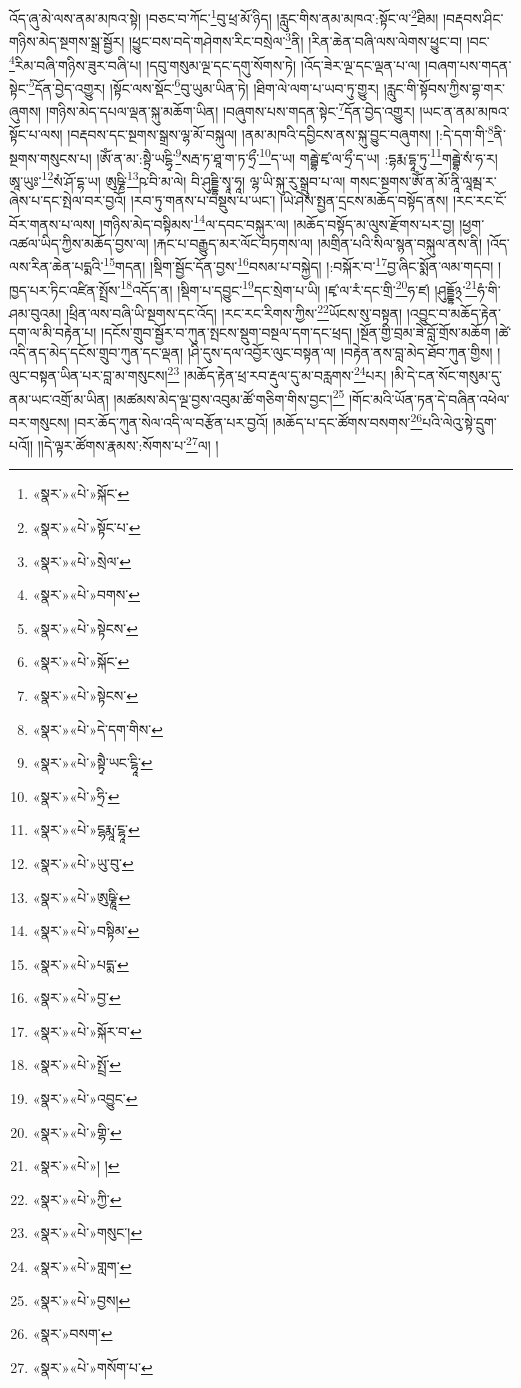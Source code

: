 འོད་ཞུ་མེ་ལས་ནམ་མཁའ་སྟེ། །བཅང་བ་ཀོང་\footnote{«སྣར་»«པེ་»སྐོང་}བུ་ཕྲ་མོ་ཉིད། །རླུང་གིས་ནམ་མཁའ་:སྟོང་ལ་\footnote{«སྣར་»«པེ་»སྟོང་པ་}ཐིམ། །བརྡབས་ཤིང་གཉིས་མེད་སྔགས་སྒྲ་སྦྱོར། །ཕྱུང་བས་བདེ་གཤེགས་རིང་བསྲེལ་\footnote{«སྣར་»«པེ་»སྲེལ་}ནི། །རིན་ཆེན་བཞི་ལས་ལེགས་ཕྱུང་བ། །བང་\footnote{«སྣར་»«པེ་»བགས་}རིམ་བཞི་གཉིས་ཟུར་བཞི་པ། །དབུ་གསུམ་ལྔ་དང་དགུ་སོགས་ཏེ། །འོད་ཟེར་ལྔ་དང་ལྡན་པ་ལ། །བཞག་པས་གདན་སྟེང་\footnote{«སྣར་»«པེ་»སྟེངས་}དོན་བྱེད་འགྱུར། །སྟོང་ལས་སྡོང་\footnote{«སྣར་»«པེ་»སྐོང་}བུ་ཡུམ་ཡིན་ཏེ། །ཐིག་ལེ་ལག་པ་ཡབ་ཏུ་གྱུར། །རླུང་གི་སྟོབས་ཀྱིས་བྷ་གར་ཞུགས། །གཉིས་མེད་དཔལ་ལྡན་སྐུ་མཆོག་ཡིན། །བཞུགས་པས་གདན་སྟེང་\footnote{«སྣར་»«པེ་»སྟེངས་}དོན་བྱེད་འགྱུར། །ཡང་ན་ནམ་མཁའ་སྟོང་པ་ལས། །བརྡབས་དང་སྔགས་སྒྲས་ལྷ་མོ་བསྐུལ། །ནམ་མཁའི་དབྱིངས་ནས་སྐུ་བྱུང་བཞུགས། །:དེ་དག་གི་\footnote{«སྣར་»«པེ་»དེ་དག་གིས་}ནི་སྔགས་གསུངས་པ། །ཨོཾ་ན་མ་:སྟྲཻ་ཡངྷྭི་\footnote{«སྣར་»«པེ་»སྟྭཻ་ཡང་ངྷཱི་}སརྦ་ཏ་ཐཱ་ག་ཏ་ཧྲྀ་\footnote{«སྣར་»«པེ་»ཧྲི་}ད་ཡ། གརྦྷེ་ཛྭ་ལ་ཧྲྀ་ད་ཡ། :དྷརྨ་དྷཱ་ཏུ་\footnote{«སྣར་»«པེ་»ངྷརྨཱ་ངྷཱ་}གརྦྷེ་སཾ་ཧ་ར། ཨཱ་ཡུཿ་\footnote{«སྣར་»«པེ་»ཡུ་བུ་}སཾ་ཤོ་དྷ་ཡ། ཨུཥྞི་\footnote{«སྣར་»«པེ་»ཨུཥྞཱི་}ཥ་བི་མ་ལེ། བི་ཤུདྡྷི་སྭཱ་ཧཱ། ལྷ་ཡི་སྐུ་རུ་སྒྲུབ་པ་ལ། གསང་སྔགས་ཨོཾ་ན་མོ་ནཱི་ལཱམྦ་ར་ཞེས་པ་དང་སྤེལ་བར་བྱའོ། །རབ་ཏུ་གནས་པ་བསྡུས་པ་ཡང་། །ཡེ་ཤེས་སྤྱན་དྲངས་མཆོད་བསྟོད་ནས། །རང་རང་ངོ་བོར་གནས་པ་ལས། །གཉིས་མེད་བསྟིམས་\footnote{«སྣར་»«པེ་»བསྟིམ་}ལ་དབང་བསྐུར་ལ། །མཆོད་བསྟོད་མ་ལུས་རྫོགས་པར་བྱ། །ཕྱག་འཚལ་ཡིད་ཀྱིས་མཆོད་བྱས་ལ། །རྐང་པ་བརྒྱུད་མར་ལོང་བཏགས་ལ། །མགྲིན་པའི་སིལ་སྙན་བསྐུལ་ནས་ནི། །འོད་ལས་རིན་ཆེན་པདྨའི་\footnote{«སྣར་»«པེ་»པདྨ་}གདན། །སྡིག་སྦྱོང་དོན་བྱས་\footnote{«སྣར་»«པེ་»བྱ་}བསམ་པ་བསྐྱེད། །:བསྐོར་བ་\footnote{«སྣར་»«པེ་»སྐོར་བ་}བྱ་ཞིང་སྨོན་ལམ་གདབ། །ཁྱད་པར་ཏིང་འཛིན་སྤྲོས་\footnote{«སྣར་»«པེ་»སྤྲོ་}འདོད་ན། །སྡིག་པ་དབྱུང་\footnote{«སྣར་»«པེ་»འབྱུང་}དང་སྲེག་པ་ཡི། །ཛྭ་ལ་རཾ་དང་གྲི་\footnote{«སྣར་»«པེ་»གྷི་}ཧ་ཛ། །ཤུདྡྷོ྅་\footnote{«སྣར་»«པེ་»། །}ཧཾ་གི་ཤམ་བུའམ། །ཕྲིན་ལས་བཞི་ཡི་སྔགས་དང་འོད། །རང་རང་རིགས་ཀྱིས་\footnote{«སྣར་»«པེ་»ཀྱི་}ཡོངས་སུ་བསྟན། །འབྱུང་བ་མཆོད་རྟེན་དག་ལ་མི་བརྟེན་པ། །དངོས་གྲུབ་སྦྱོར་བ་ཀུན་སྤངས་སྡུག་བསྔལ་དག་དང་ཕྲད། །སྔོན་གྱི་བྲམ་ཟེ་བློ་གྲོས་མཆོག །ཚེ་འདི་ནད་མེད་དངོས་གྲུབ་ཀུན་དང་ལྡན། །ཤི་དུས་དལ་འབྱོར་ལུང་བསྟན་ལ། །བརྟེན་ནས་བླ་མེད་ཐོབ་ཀུན་གྱིས། །ལུང་བསྟན་ཡིན་པར་བླ་མ་གསུངས།\footnote{«སྣར་»«པེ་»གསུང་།} །མཆོད་རྟེན་ཕྲ་རབ་རྡུལ་དུ་མ་བརླགས་\footnote{«སྣར་»«པེ་»གླག་}པར། །མི་དེ་ངན་སོང་གསུམ་དུ་ནམ་ཡང་འགྲོ་མ་ཡིན། །མཚམས་མེད་ལྔ་བྱས་འབུམ་ཚོ་གཅིག་གིས་བྱང་།\footnote{«སྣར་»«པེ་»བྱས།} །གོང་མའི་ཡོན་ཏན་དེ་བཞིན་འཕེལ་བར་གསུངས། །བར་ཆོད་ཀུན་སེལ་འདི་ལ་བརྩོན་པར་བྱའོ། །མཆོད་པ་དང་ཚོགས་བསགས་\footnote{«སྣར་»བསག་}པའི་ལེའུ་སྟེ་དྲུག་པའོ།། །།དེ་ལྟར་ཚོགས་རྣམས་:སོགས་པ་\footnote{«སྣར་»«པེ་»གསོག་པ་}ལ། །
